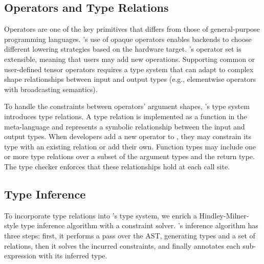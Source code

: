   \subsection*{Operators and Type Relations}
  Operators are one of the key primitives that differs from those of
    general-purpose programming languages.
  \relay's use of opaque operators enables backends to choose different
    lowering strategies based on the hardware target.
  \relay's operator set is extensible, meaning that users may add new operations.
  Supporting common or user-defined tensor operators requires a type system that can
    adapt to complex shape relationships between input and output types
    (e.g., elementwise operators with broadcasting semantics).

  To handle the constraints between operators' argument shapes, \relay's type system
    introduces type relations.
  A type relation is implemented as a function in the
    meta-language and represents a symbolic relationship between
    the input and output types.
  When developers add a new operator to \relay, they may constrain its
    type with an existing relation or add their own.
  Function types may include
    one or more type relations over a subset of the argument types and the return type.
  The type checker enforces that these relationships hold at each call site.

  \subsection*{Type Inference}
  \label{sec:inference}

  To incorporate type relations into \relay's type system, we enrich
    a Hindley-Milner-style type inference algorithm with
    a constraint solver.
  \relay's inference algorithm has three steps: first, it
    performs a pass over the AST, generating types and a set of relations,
    then it solves the incurred constraints,
    and finally annotates each sub-expression with its inferred type.


